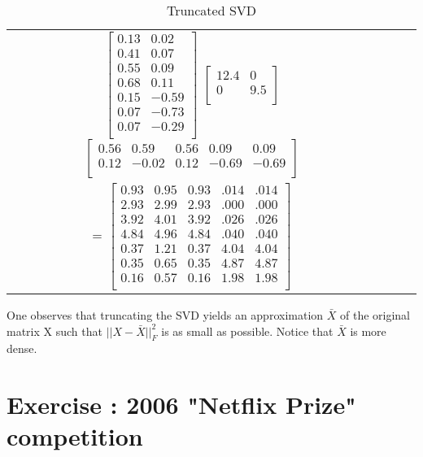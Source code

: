 \documentclass{article}
\begin{document}
\begin{table}[ht]
    \centering
    \begin{tabular}{cccc}
        $\begin{bmatrix}
            0.13 & 0.02\\
            0.41 & 0.07\\
            0.55 & 0.09\\
            0.68 & 0.11\\
            0.15 & -0.59\\
            0.07 & -0.73\\
            0.07 & -0.29\\
        \end{bmatrix}$
        $\begin{bmatrix}
            12.4 & 0\\
            0 & 9.5\\
        \end{bmatrix}$
        $\begin{bmatrix}
            0.56 & 0.59 & 0.56 & 0.09 & 0.09\\
            0.12 & -0.02 & 0.12 & -0.69 & -0.69\\
        \end{bmatrix}$ \\
        = 
        $\begin{bmatrix}
            0.93 & 0.95 & 0.93 & .014 & .014\\
            2.93 & 2.99 & 2.93 & .000 & .000\\
            3.92 & 4.01 & 3.92 & .026 & .026\\
            4.84 & 4.96 & 4.84 & .040 & .040\\
            0.37 & 1.21 & 0.37 & 4.04 & 4.04\\
            0.35 & 0.65 & 0.35 & 4.87 & 4.87\\
            0.16 & 0.57 & 0.16 & 1.98 & 1.98\\
        \end{bmatrix}$
    \end{tabular}
    \caption{Truncated SVD}
    \label{tab:decomposition}
\end{table}

One observes that truncating the SVD yields an approximation $\bar{X}$ of the original matrix X such that $||X-\bar{X}||_F^2$ is as small as possible. Notice that $\bar{X}$ is more dense.

\section{Exercise : 2006 "Netflix Prize" competition}
\end{document}
